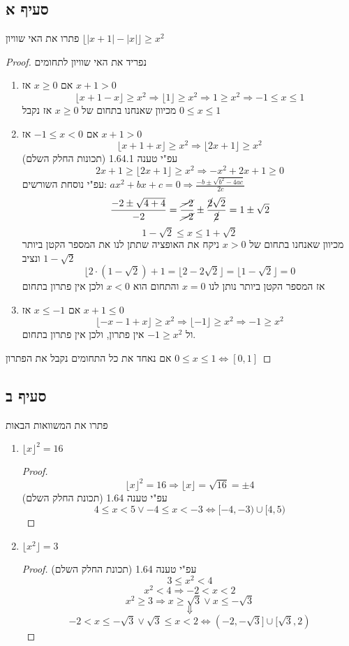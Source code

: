 \documentclass{article}
\begin{document}
	\subsection*{סעיף א}
	פתרו את האי שוויון
	$\lfloor |x+1| - |x| \rfloor \geq x^2$
	\begin{proof}
		נפריד את האי שוויון לתחומים
		\begin{enumerate}[I]
			\item אם $x \geq 0$ אז $x + 1 > 0$
			\[
				\lfloor x + 1 - x \rfloor \geq x^2 \Rightarrow
				\lfloor 1 \rfloor \geq x^2 \Rightarrow
				1 \geq x^2 \Rightarrow
				-1 \leq x \leq 1
			\]
				מכיוון שאנחנו בתחום של $x \geq 0$ אז נקבל $0 \leq x \leq 1$
			\item אם $-1 \leq x < 0$ אז $x+1 > 0$
			\[
				\lfloor x + 1 + x \rfloor \geq x^2 \Rightarrow
				\lfloor 2x+1 \rfloor \geq x^2
			\]
			עפ"י טענה 1.64.1 (תכונות החלק השלם)
			\[
				2x + 1 \geq \lfloor 2x + 1 \rfloor \geq x^2 \Rightarrow
				-x^2 + 2x + 1 \geq 0
			\]
			עפ"י נוסחת השורשים:
			$ax^2 + bx + c = 0 \Rightarrow \frac{-b \pm \sqrt{b^2 -4ac}}{2c}$
			\[
			\frac{-2 \pm \sqrt{4+4}}{-2} =
			\frac{\cancel{-2}}{\cancel{-2}} \pm \frac{\cancel{2}\sqrt{2}}{\cancel{2}} =
			1 \pm \sqrt{2}
			 \]
			 \[ 1 - \sqrt{2} \leq x \leq 1 + \sqrt{2} \]
			 מכיוון שאנחנו בתחום של $x > 0$ ניקח את האופציה שתתן לנו את המספר הקטן ביותר $1 - \sqrt{2}$ ונציב
			 \[
			 	\lfloor2 \cdot (1 - \sqrt{2}) + 1 = \lfloor 2 - 2\sqrt{2} \rfloor = \lfloor 1 - \sqrt{2} \rfloor = 0
			 \]
 			 אז המספר הקטן ביותר נותן לנו $x=0$ והתחום הוא $x<0$ ולכן אין פתרון בתחום
 			 \item אם $x \leq -1$ אז $x + 1 \leq 0$
 			 \[
 			 	\lfloor -x -1 +x \rfloor \geq x^2 \Rightarrow
 			 	\lfloor -1 \rfloor \geq x^2 \Rightarrow
 			 	-1 \geq x^2
 			 \]
 			 ול $-1 \geq x^2 $ אין פתרון, ולכן אין פתרון בתחום.
		\end{enumerate}
	אם נאחד את כל התחומים נקבל את הפתרון
	$0 \leq x \leq 1 \iff [0,1]$
	\end{proof}

	\subsection*{סעיף ב}
	פתרו את המשוואות הבאות
	\begin{enumerate}[i]
		\item $\lfloor x \rfloor^2 = 16$
		\begin{proof}
			\[
				\lfloor x \rfloor^2 = 16 \Rightarrow
				\lfloor x \rfloor = \sqrt{16} = \pm 4
			\]
			עפ"י טענה 1.64 (תכונת החלק השלם)
			\[4 \leq x < 5 \lor -4 \leq x < -3 \iff [-4, -3) \cup [4,5) \]
		\end{proof}
		\item $\lfloor x^2 \rfloor = 3$
		\begin{proof}
			עפ"י טענה 1.64 (תכונת החלק השלם)
			\[3 \leq x^2 < 4\]
			\[ x^2 < 4 \Rightarrow  -2 < x < 2 \]
			\[ x^2 \geq 3 \Rightarrow  x \geq \sqrt{3} \lor x \leq - \sqrt{3} \]
			\[\Downarrow\]
			\[ -2 < x \leq -\sqrt{3} \lor \sqrt{3} \leq x < 2  \iff
				(-2, -\sqrt{3}] \cup [\sqrt{3}, 2)
			\]
		\end{proof}
	\end{enumerate}
\end{document}
